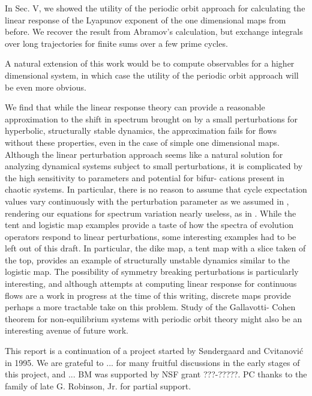 \documentclass[aps,pre,
                showpacs,
                twocolumn,
                groupedaddress,
                superscriptaddress,
                floatfix]{revtex4-1}
\begin{document}
In Sec. V, we showed the utility of the periodic orbit approach for
calculating the linear response of the Lyapunov exponent of the one
dimensional maps from before. We recover the result from Abramov's
calculation, but exchange integrals over long trajectories for finite
sums over a few prime cycles.

A natural extension of this work would be to compute observables for a
higher dimensional system, in which case the utility of the periodic
orbit approach will be even more obvious.

We find that while the linear response theory can provide a reasonable
approximation to the shift in spectrum brought on by a small
perturbations for hyperbolic, structurally stable dynamics, the
approximation fails for flows without these properties, even in the case
of simple one dimensional maps. Although the linear perturbation approach
seems like a natural solution for analyzing dynamical systems subject to
small perturbations, it is complicated by the high sensitivity to
parameters and potential for bifur- cations present in chaotic systems.
In particular, there is no reason to assume that cycle expectation values
vary continuously with the perturbation parameter as we assumed in
, rendering our equations for spectrum variation
nearly useless, as in .
While the tent and logistic map examples provide a taste of how the
spectra of evolution operators respond to linear perturbations, some
interesting examples had to be left out of this draft. In particular, the
dike map, a tent map with a slice taken of the top, provides
an example of structurally unstable dynamics similar to the logistic map.
The possibility of symmetry breaking perturbations is particularly
interesting, and although attempts at computing linear response for
continuous flows are a work in progress at the time of this writing,
discrete maps provide perhaps a more tractable take on this problem.
Study of the Gallavotti- Cohen theorem for non-equilibrium systems
with periodic orbit theory might also be an interesting avenue of future
work.


\begin{acknowledgments}
This report is a continuation of a project started by S{\o}ndergaard and
Cvitanovi\'c in 1995.
We are grateful to ... for many fruitful discussions in
the early stages of this project, and ...
BM was supported by NSF grant ???-?????.
PC thanks to the family of late G. Robinson, Jr. for partial support.
\end{acknowledgments}
\end{document}
